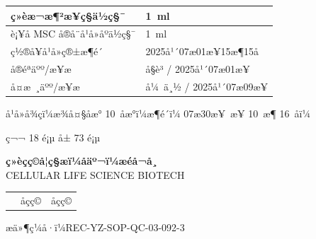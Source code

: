\documentclass[UTF8,10pt,a4paper,fontset=fandol]{ctexart}
\newcommand{\fieldvalue}[1]{#1}
\newcommand{\handwritten}[1]{#1}
\begin{document}
\begin{tabularx}{\textwidth}{|X|X|}
\hline
ç»èæ¬æ¶²æ¥ç§ä½ç§¯ &
\fieldvalue{\handwritten{1}}\ ml \\ \hline
è¡¥å MSC å®å¨å¹å»åºä½ç§¯ &
\fieldvalue{\handwritten{1}}\ ml \\ \hline
ç½®å¥å¹å»ç®±æ¶é´ &
\fieldvalue{\handwritten{2025å¹´07æ01æ¥15æ¶15å}} \\ \hline
å®éªäºº/æ¥æ &
\fieldvalue{\handwritten{å§è³}} /
\fieldvalue{\handwritten{2025å¹´07æ01æ¥}} \\ \hline
å¤æ ¸äºº/æ¥æ &
\fieldvalue{\handwritten{å¼ ä¸½}} /
\fieldvalue{\handwritten{2025å¹´07æ09æ¥}} \\ \hline
\end{tabularx}

\begin{center}
å¹å»å¾çï¼æ¾å¤§åæ°
\fieldvalue{\handwritten{10}}\ åæ°ï¼æ¶é´ï¼
\fieldvalue{\handwritten{07æ30æ¥}}\ æ¥
\fieldvalue{\handwritten{10}}\ æ¶
\fieldvalue{\handwritten{16}}\ åï¼
\end{center}

\begin{center}
ç¬¬ 18 é¡µ å± 73 é¡µ
\end{center}

\newpage

\begin{center}
\small
\textbf{ç»èçç©å­¦ç§æï¼åäº¬ï¼æéå¬å¸}\\
CELLULAR LIFE SCIENCE BIOTECH

\vspace{2mm}
\begin{tabularx}{\textwidth}{@{}lXr@{}}
 & \centering åçç© & åçç©\\
\end{tabularx}

\vspace{2mm}
æä»¶ç¼å·ï¼REC-YZ-SOP-QC-03-092-3
\end{center}
\end{document}

